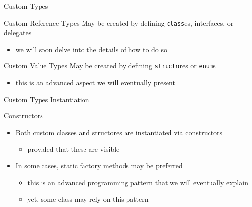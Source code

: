 \documentclass[presentation]{beamer}
\begin{document}
\begin{frame}{Custom \dotnet Types}
    \begin{exampleblock}{Custom Reference Types}\centering
        May be created by defining \alert{\texttt{class}es}, \alert{interfaces}, or \alert{delegates}
        \begin{itemize}
            \item we will soon delve into the details of how to do so
        \end{itemize}
    \end{exampleblock}

    \begin{exampleblock}{Custom Value Types}\centering
        May be created by defining \alert{\texttt{struct}ures} or \alert{\texttt{enum}s}
        \begin{itemize}
            \item this is an advanced aspect we will eventually present
        \end{itemize}
    \end{exampleblock}

\end{frame}

\begin{frame}{Custom Types Instantiation}
    \begin{block}{Constructors}
        \begin{itemize}
            \item Both custom classes and structores are instantiated via \alert{constructors}
            \begin{itemize}
                \item provided that these are \alert{visible}
            \end{itemize}

            \item In some cases, \alert{static factory methods} may be preferred
            \begin{itemize}
                \item this is an advanced programming pattern that we will eventually explain
                \item yet, some \dotnet class may rely on this pattern
            \end{itemize}
        \end{itemize}
    \end{block}
\end{frame}
\end{document}
